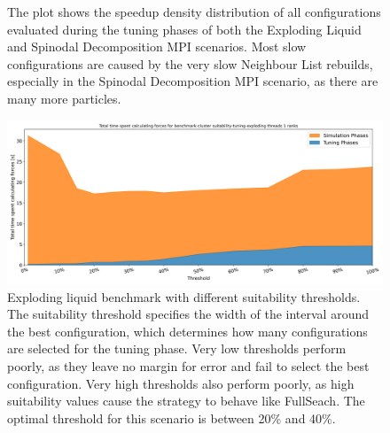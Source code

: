 \begin{figure}[H]
    \caption[Quality of predictions during tuning phases]{The plot shows the speedup density distribution of all configurations evaluated during the tuning phases of both the Exploding Liquid and Spinodal Decomposition MPI scenarios. Most slow configurations are caused by the very slow Neighbour List rebuilds, especially in the Spinodal Decomposition MPI scenario, as there are many more particles.}
    \label{fig:tuningPhaseSpeedup}
\end{figure}


\begin{figure}
    \centering
    \includegraphics[width=\columnwidth]{figures/Benchmark/SuitabilitySearch/SuitabilityExploding_timings_threshold_benchmark-cluster_suitability-tuning-exploding_1.png}
    \caption[Exploding liquid benchmark with different suitability thresholds]{Exploding liquid benchmark with different suitability thresholds. The suitability threshold specifies the width of the interval around the best configuration, which determines how many configurations are selected for the tuning phase. Very low thresholds perform poorly, as they leave no margin for error and fail to select the best configuration. Very high thresholds also perform poorly, as high suitability values cause the strategy to behave like FullSeach. The optimal threshold for this scenario is between 20\% and 40\%.}
    \label{fig:suitabilityThreshold}
\end{figure}